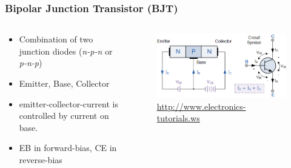 \documentclass{beamer}
\begin{document}
\begin{frame}\frametitle{Bipolar Junction Transistor (BJT)} 
\begin{columns}
\begin{column}{6cm}
\begin{itemize}
\item Combination of two junction diodes (\textit{n-p-n} or \textit{p-n-p}) \newline

\item Emitter, Base, Collector \newline

\item emitter-collector-current is controlled by current on base. \newline

\item EB in forward-bias, CE in reverse-bias

\end{itemize}
\end{column}
\begin{column}{5cm}
\begin{figure}[H]
\centering
\includegraphics[width=1.1\textwidth]{npn}
\caption{\url{http://www.electronics-tutorials.ws}}%
\end{figure}
\end{column}
\end{columns}
\end{frame}
\end{document}
